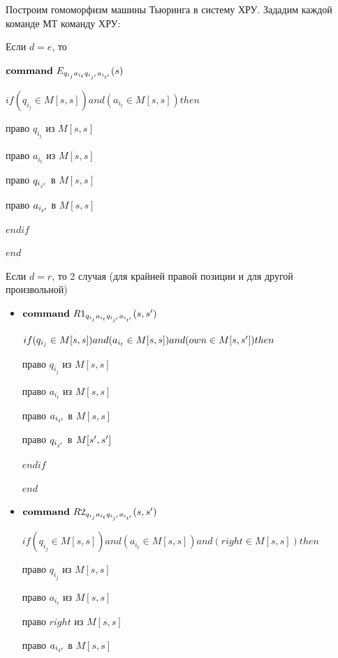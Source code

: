 \begin{proofs}
\begin{dokvo}
		Построим гомоморфизм машины Тьюринга в систему ХРУ. Зададим каждой команде МТ команду ХРУ:

		Если $d = e$, то

		$\mathbf{command} \  E_{q_{i_{j}}a_{i_{t}}q_{i_{j^{\prime}}}a_{i_{t^{\prime}}}}(s)$

		$if (q_{i_{j}} \in M[s,s]) and (a_{i_{t}} \in M[s,s]) then $

		 право $q_{i_{j}}$ из $M[s,s]$

		 право $a_{i_{t}}$ из $M[s,s]$

		 право $q_{i_{j^{\prime}}}$ в $M[s,s]$

		 право $a_{i_{t^{\prime}}}$ в $M[s,s]$

		$endif$

		$end$

		Если $d = r$, то 2 случая (для крайней правой позиции и для другой произвольной)
		\begin{multicols}{2}
			\begin{itemize}
				\item 	$\mathbf{command} \  R1_{q_{i_{j}}a_{i_{t}}q_{i_{j^{\prime}}}a_{i_{t^{\prime}}}}(s, s^{\prime})$

					$if (q_{i_{j}} \in M[s,s]) and (a_{i_{t}} \in M[s,s]) and (own \in M[s,s^{\prime}]) then $

					 право $q_{i_{j}}$ из $M[s,s]$

					 право $a_{i_{t}}$ из $M[s,s]$

					 право $a_{i_{t^{\prime}}}$ в $M[s,s]$

					 право $q_{i_{j^{\prime}}}$ в $M[s^{\prime},s^{\prime}]$

					$endif$

					$end$

					\item $\mathbf{command} \  R2_{q_{i_{j}}a_{i_{t}}q_{i_{j^{\prime}}}a_{i_{t^{\prime}}}}(s, s^{\prime})$

					$if (q_{i_{j}} \in M[s,s]) and (a_{i_{t}} \in M[s,s])and (right \in M[s,s]) then $

					 право $q_{i_{j}}$ из $M[s,s]$

					 право $a_{i_{t}}$ из $M[s,s]$

					 право $right$ из $M[s,s]$

					 право $a_{i_{t^{\prime}}}$ в $M[s,s]$


\end{itemize}
\end{multicols}
\end{dokvo}
\end{proofs}
